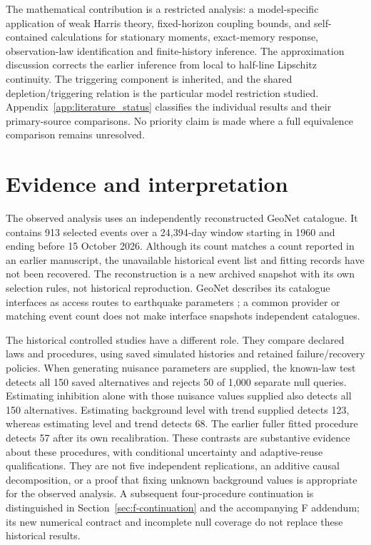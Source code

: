 The mathematical contribution is a restricted analysis: a model-specific application of weak Harris theory, fixed-horizon coupling bounds, and self-contained calculations for stationary moments, exact-memory response, observation-law identification and finite-history inference. The approximation discussion corrects the earlier inference from local to half-line Lipschitz continuity. The triggering component is inherited, and the shared depletion/triggering relation is the particular model restriction studied. Appendix~\ref{app:literature_status} classifies the individual results and their primary-source comparisons. No priority claim is made where a full equivalence comparison remains unresolved.

\section{Evidence and interpretation}
\label{sec:intro_evidence}

The observed analysis uses an independently reconstructed GeoNet catalogue. It contains 913 selected events over a 24,394-day window starting in 1960 and ending before 15 October 2026. Although its count matches a count reported in an earlier manuscript, the unavailable historical event list and fitting records have not been recovered. The reconstruction is a new archived snapshot with its own selection rules, not historical reproduction. GeoNet describes its catalogue interfaces as access routes to earthquake parameters \citep{GeoNet2026}; a common provider or matching event count does not make interface snapshots independent catalogues.

The historical controlled studies have a different role. They compare declared laws and procedures, using saved simulated histories and retained failure/recovery policies. When generating nuisance parameters are supplied, the known-law test detects all 150 saved alternatives and rejects 50 of 1,000 separate null queries. Estimating inhibition alone with those nuisance values supplied also detects all 150 alternatives. Estimating background level with trend supplied detects 123, whereas estimating level and trend detects 68. The earlier fuller fitted procedure detects 57 after its own recalibration. These contrasts are substantive evidence about these procedures, with conditional uncertainty and adaptive-reuse qualifications. They are not five independent replications, an additive causal decomposition, or a proof that fixing unknown background values is appropriate for the observed analysis. A subsequent four-procedure continuation is distinguished in Section~\ref{sec:f-continuation} and the accompanying F addendum; its new numerical contract and incomplete null coverage do not replace these historical results.

